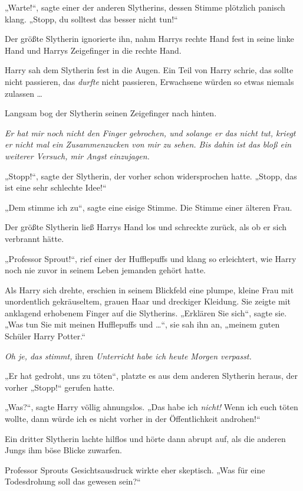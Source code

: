{„Warte!“, sagte einer der anderen Slytherins, dessen Stimme plötzlich panisch klang. „Stopp, du solltest das besser nicht tun!“

Der größte Slytherin ignorierte ihn, nahm Harrys rechte Hand fest in seine linke Hand und Harrys Zeigefinger in die rechte Hand.

Harry sah dem Slytherin fest in die Augen. Ein Teil von Harry schrie, das sollte nicht passieren, das \emph{durfte} nicht passieren, Erwachsene würden so etwas niemals zulassen …

Langsam bog der Slytherin seinen Zeigefinger nach hinten.

\emph{Er hat mir noch nicht den Finger gebrochen, und solange er das nicht tut, kriegt er nicht mal ein Zusammenzucken von mir zu sehen. Bis dahin ist das bloß ein weiterer Versuch, mir Angst einzujagen.}

„Stopp!“, sagte der Slytherin, der vorher schon widersprochen hatte. „Stopp, das ist eine sehr schlechte Idee!“

„Dem stimme ich zu“, sagte eine eisige Stimme. Die Stimme einer älteren Frau.

Der größte Slytherin ließ Harrys Hand los und schreckte zurück, als ob er sich verbrannt hätte.

„Professor Sprout!“, rief einer der Hufflepuffs und klang so erleichtert, wie Harry noch nie zuvor in seinem Leben jemanden gehört hatte.

Als Harry sich drehte, erschien in seinem Blickfeld eine plumpe, kleine Frau mit unordentlich gekräuseltem, grauen Haar und dreckiger Kleidung. Sie zeigte mit anklagend erhobenem Finger auf die Slytherins. „Erklären Sie sich“, sagte sie. „Was tun Sie mit meinen Hufflepuffs und …“, sie sah ihn an, „meinem guten Schüler Harry Potter.“

\emph{Oh je, das stimmt,} ihren \emph{Unterricht habe ich heute Morgen verpasst.}

„Er hat gedroht, uns zu töten“, platzte es aus dem anderen Slytherin heraus, der vorher „Stopp!“ gerufen hatte.

„Was?“, sagte Harry völlig ahnungslos. „Das habe ich \emph{nicht!} Wenn ich euch töten wollte, dann würde ich es nicht vorher in der Öffentlichkeit androhen!“

Ein dritter Slytherin lachte hilflos und hörte dann abrupt auf, als die anderen Jungs ihm böse Blicke zuwarfen.

Professor Sprouts Gesichtsausdruck wirkte eher skeptisch. „Was für eine Todesdrohung soll das gewesen sein?“

}
